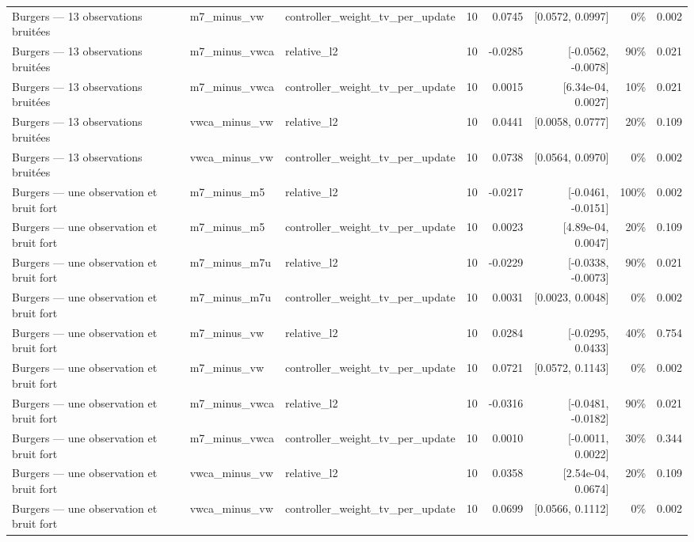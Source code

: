 \begin{tabular}{llllrrrr}
Burgers — 13 observations bruitées & m7\_minus\_vw & controller\_weight\_tv\_per\_update & 10 & 0.0745 & [0.0572, 0.0997] & 0\% & 0.002 \\
Burgers — 13 observations bruitées & m7\_minus\_vwca & relative\_l2 & 10 & -0.0285 & [-0.0562, -0.0078] & 90\% & 0.021 \\
Burgers — 13 observations bruitées & m7\_minus\_vwca & controller\_weight\_tv\_per\_update & 10 & 0.0015 & [6.34e-04, 0.0027] & 10\% & 0.021 \\
Burgers — 13 observations bruitées & vwca\_minus\_vw & relative\_l2 & 10 & 0.0441 & [0.0058, 0.0777] & 20\% & 0.109 \\
Burgers — 13 observations bruitées & vwca\_minus\_vw & controller\_weight\_tv\_per\_update & 10 & 0.0738 & [0.0564, 0.0970] & 0\% & 0.002 \\
Burgers — une observation et bruit fort & m7\_minus\_m5 & relative\_l2 & 10 & -0.0217 & [-0.0461, -0.0151] & 100\% & 0.002 \\
Burgers — une observation et bruit fort & m7\_minus\_m5 & controller\_weight\_tv\_per\_update & 10 & 0.0023 & [4.89e-04, 0.0047] & 20\% & 0.109 \\
Burgers — une observation et bruit fort & m7\_minus\_m7u & relative\_l2 & 10 & -0.0229 & [-0.0338, -0.0073] & 90\% & 0.021 \\
Burgers — une observation et bruit fort & m7\_minus\_m7u & controller\_weight\_tv\_per\_update & 10 & 0.0031 & [0.0023, 0.0048] & 0\% & 0.002 \\
Burgers — une observation et bruit fort & m7\_minus\_vw & relative\_l2 & 10 & 0.0284 & [-0.0295, 0.0433] & 40\% & 0.754 \\
Burgers — une observation et bruit fort & m7\_minus\_vw & controller\_weight\_tv\_per\_update & 10 & 0.0721 & [0.0572, 0.1143] & 0\% & 0.002 \\
Burgers — une observation et bruit fort & m7\_minus\_vwca & relative\_l2 & 10 & -0.0316 & [-0.0481, -0.0182] & 90\% & 0.021 \\
Burgers — une observation et bruit fort & m7\_minus\_vwca & controller\_weight\_tv\_per\_update & 10 & 0.0010 & [-0.0011, 0.0022] & 30\% & 0.344 \\
Burgers — une observation et bruit fort & vwca\_minus\_vw & relative\_l2 & 10 & 0.0358 & [2.54e-04, 0.0674] & 20\% & 0.109 \\
Burgers — une observation et bruit fort & vwca\_minus\_vw & controller\_weight\_tv\_per\_update & 10 & 0.0699 & [0.0566, 0.1112] & 0\% & 0.002 \\

\end{tabular}
